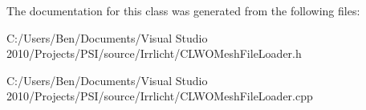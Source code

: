 The documentation for this class was generated from the following files\-:\begin{DoxyCompactItemize}
\item 
C\-:/\-Users/\-Ben/\-Documents/\-Visual Studio 2010/\-Projects/\-P\-S\-I/source/\-Irrlicht/C\-L\-W\-O\-Mesh\-File\-Loader.\-h\item 
C\-:/\-Users/\-Ben/\-Documents/\-Visual Studio 2010/\-Projects/\-P\-S\-I/source/\-Irrlicht/C\-L\-W\-O\-Mesh\-File\-Loader.\-cpp\end{DoxyCompactItemize}

